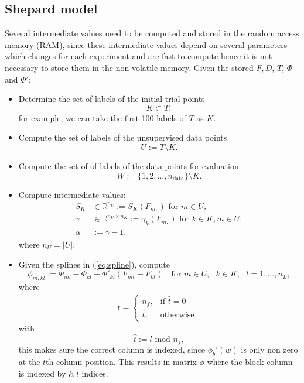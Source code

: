 \documentclass[12pt]{article}
\begin{document}
\subsection{Shepard model}
Several intermediate values need to be computed and stored in the random access memory (RAM), since these intermediate values depend on several parameters which changes for each experiment and are fast to compute hence it is not necessary to store them in the non-volatile memory. Given the stored $F, D$, $T$, $\Phi$ and $\Phi'$:
\begin{itemize}
	\item Determine the set of labels of the initial trial points
	\begin{equation}
		K \subset T,
	\end{equation}
	for example, we can take the first 100 labels of $T$ as $K$.
	\item Compute the set of labels of the unsupervised data points
	\begin{equation}
		U := T \setminus K.
	\end{equation}
	\item Compute the set of of labels of the data points for evaluation
	\begin{equation}
		W := \{1,2,...,n_\text{data}\} \setminus K.
	\end{equation}
	\item Compute intermediate values:
	\begin{equation}
		\label{eq:intermediate}
		\begin{split}
			S_K &\in \mathbb{R}^{n_U} := S_K(F_{m:}) \text{ for } m \in U,\\
			\gamma &\in \mathbb{R}^{n_U \times n_K} := \gamma_k(F_{m:}) \text{ for } k \in K, m \in U, \\
			\alpha &:= \gamma - 1.
		\end{split}
	\end{equation}
	where $n_U = |U|.$
	\item Given the splines in (\ref{eq:spline}), compute
	\begin{equation} %
		\phi_{m, kl} := \Phi_{ml} - \Phi_{kl} - \Phi'_{kl}(F_{mt}-F_{kt}) \quad \text{for } m \in U, \text{ }k \in K, \text{ }l = 1,...,n_L,
	\end{equation}
	where
	\begin{equation}
		\begin{split}
			t = 
			\begin{cases}
				n_f,  & \text{if } \hat{t} = 0 \\
				\hat{t}, & \text{otherwise}
			\end{cases}
			~~ 
		\end{split}
	\end{equation}
	with
	\begin{equation}
		\hat{t} := l \text{ mod } n_f,
	\end{equation}
	this makes sure the correct column is indexed, since $\phi_b'(w)$ is only non zero at the $t$th column position. This results in matrix $\phi$ where the block column is indexed by $k,l$ indices.
\end{itemize}
\end{document}
